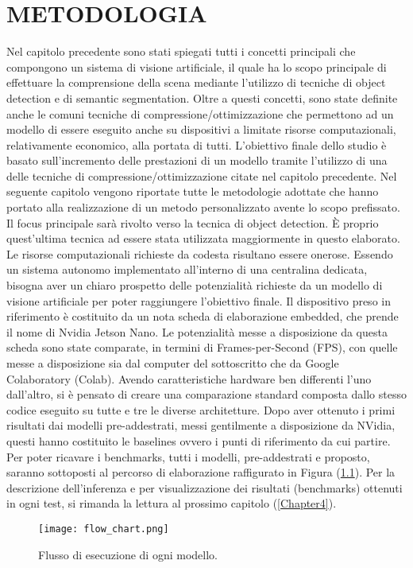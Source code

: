 
\chapter{METODOLOGIA}
\label{Capitolo3}
\thispagestyle{empty}

Nel capitolo precedente sono stati spiegati tutti i concetti principali che 
compongono un sistema di visione artificiale, il quale ha lo scopo principale 
di effettuare la comprensione della scena mediante l'utilizzo di tecniche di 
object detection e di semantic segmentation. Oltre a questi concetti, sono 
state definite anche le comuni tecniche di compressione/ottimizzazione che 
permettono ad un modello di essere eseguito anche su dispositivi a limitate 
risorse computazionali, relativamente economico, alla portata di tutti. 
L'obiettivo finale dello studio è basato sull'incremento delle prestazioni di 
un modello tramite l'utilizzo di una delle tecniche di compressione/ottimizzazione 
citate nel capitolo precedente. Nel seguente capitolo vengono 
riportate tutte le metodologie adottate che hanno portato alla realizzazione 
di un metodo personalizzato avente lo scopo prefissato. Il focus principale 
sarà rivolto verso la tecnica di object detection. È proprio quest'ultima 
tecnica ad essere stata utilizzata maggiormente in questo elaborato. Le
risorse computazionali richieste da codesta risultano essere onerose. Essendo 
un sistema autonomo implementato all'interno di una centralina dedicata, 
bisogna aver un chiaro prospetto delle potenzialità richieste da un modello di 
visione artificiale per poter raggiungere l'obiettivo finale. Il dispositivo preso 
in riferimento è costituito da un nota scheda di elaborazione embedded, che 
prende il nome di Nvidia Jetson Nano. Le potenzialità messe a disposizione 
da questa scheda sono state comparate, in termini di Frames-per-Second 
(FPS), con quelle messe a disposizione sia dal computer del sottoscritto 
che da Google Colaboratory (Colab). Avendo caratteristiche hardware ben 
differenti l'uno dall'altro, si è pensato di creare una comparazione standard 
composta dallo stesso codice eseguito su tutte e tre le diverse architetture. 
Dopo aver ottenuto i primi risultati dai modelli pre-addestrati, messi gentilmente 
a disposizione da NVidia, questi hanno costituito le baselines ovvero 
i punti di riferimento da cui partire. Per poter ricavare i benchmarks, 
tutti i modelli, pre-addestrati e proposto, saranno sottoposti al percorso di 
elaborazione raffigurato in Figura (\ref{flow_chart}). Per la descrizione dell'inferenza e per 
visualizzazione dei risultati (benchmarks) ottenuti in ogni test, si rimanda la lettura al prossimo capitolo (\ref{Chapter4}).
\begin{figure}
    \centering
    \texttt{[image: flow\_chart.png]}
    \centering
    \caption{Flusso di esecuzione di ogni modello.}
    \label{flow_chart}
\end{figure}

